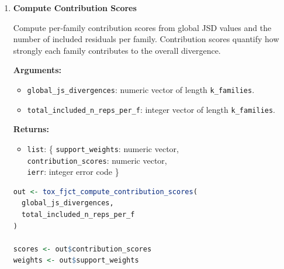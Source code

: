 \begin{enumerate}
        \begin{lstlisting}[language=R, caption={Family-Level JSD (Expert Interface)}]
out <- tox_fjct_compute_jsd_expert(
  neighborhood_residuals_S1,
  neighborhood_residuals_S2,
  neighbor_mask_S1,
  neighbor_mask_S2,
  n_bins,
  shared_residual_range
)

global_jsd <- out$global_js_divergence
weights    <- out$weights
        \end{lstlisting}

    \item \textbf{Compute Contribution Scores}

        Compute per‑family contribution scores from global JSD values and the number of included residuals per family.  
        Contribution scores quantify how strongly each family contributes to the overall divergence.

        \textbf{Arguments:}
        \begin{itemize}
            \item \lstinline!global_js_divergences!: numeric vector of length \lstinline!k_families!.
            \item \lstinline!total_included_n_reps_per_f!: integer vector of length \lstinline!k_families!.
        \end{itemize}

        \textbf{Returns:}
        \begin{itemize}
            \item \lstinline!list!: \{
                \lstinline!support_weights!: numeric vector,\\
                \lstinline!contribution_scores!: numeric vector,\\
                \lstinline!ierr!: integer error code
            \}
        \end{itemize}

        \begin{lstlisting}[language=R, caption={Contribution Score Computation}]
out <- tox_fjct_compute_contribution_scores(
  global_js_divergences,
  total_included_n_reps_per_f
)

scores <- out$contribution_scores
weights <- out$support_weights
        \end{lstlisting}
\end{enumerate}
